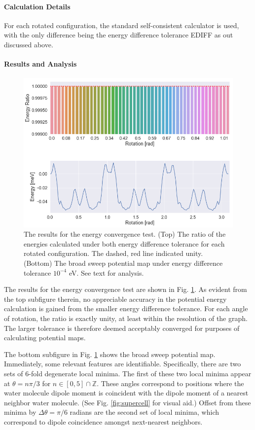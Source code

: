         \paragraph{Calculation Details} For each rotated configuration, the standard self-consistent calculator is used, with the only difference being the energy difference tolerance EDIFF as out discussed above.
        
        \paragraph{Results and Analysis}
        
        \begin{figure}
            \centering
            \includegraphics[width=0.8\linewidth]{Figures/System/pmap_convergence.png}
            \caption{The results for the energy convergence test. (Top) The ratio of the energies calculated under both energy difference tolerance for each rotated configuration. The dashed, red line indicated unity. (Bottom) The broad sweep potential map under energy difference tolerance $10^{-4}$ eV. See text for analysis. }
            \label{fig:pmap_convergence}
        \end{figure}
        
        The results for the energy convergence test are shown in Fig. \ref{fig:pmap_convergence}. As evident from the top subfigure therein, no appreciable accuracy in the potential energy calculation is gained from the smaller energy difference tolerance. For each angle of rotation, the ratio is exactly unity, at least within the resolution of the graph. The larger tolerance is therefore deemed acceptably converged for purposes of calculating potential maps.
        
        The bottom subfigure in Fig. \ref{fig:pmap_convergence} shows the broad sweep potential map. Immediately, some relevant features are identifiable. Specifically, there are two sets of 6-fold degenerate local minima. The first of these two local minima appear at $\theta = n\pi/3$ for $n\in \left[0,5\right] \cap \mathbb{Z}$. These angles correspond to positions where the water molecule dipole moment is coincident with the dipole moment of a nearest neighbor water molecule. (See Fig. \ref{fig:supercell} for visual aid.) Offset from these minima by $\Delta \theta = \pi/6$ radians are the second set of local minima, which correspond to dipole coincidence amongst next-nearest neighbors. 
        
